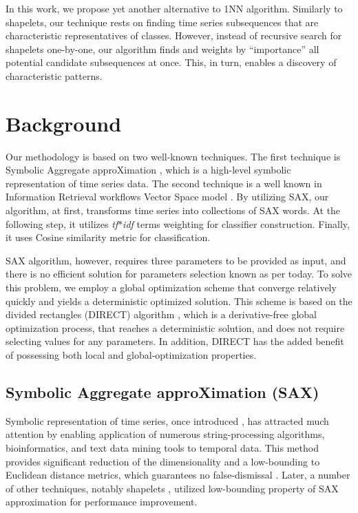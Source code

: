 \documentclass{llncs}
\begin{document}
In this work, we propose yet another alternative to 1NN algorithm. Similarly to shapelets, our
technique rests on finding time series subsequences that are characteristic representatives of
classes. However, instead of recursive search for shapelets one-by-one, our algorithm finds and
weights by ``importance'' all potential candidate subsequences at once. This, in turn, enables a
discovery of characteristic patterns.

\section{Background}
Our methodology is based on two well-known techniques. The first technique is Symbolic Aggregate
approXimation \cite{sax}, which is a high-level symbolic representation of time series
data. The second technique is a well known in Information Retrieval workflows Vector Space 
model \cite{salton}. By utilizing SAX, our algorithm, at first, transforms time series into collections of 
SAX words. At the following step, it utilizes \textit{tf$\ast$idf} terms weighting for classifier 
construction. Finally, it uses Cosine similarity metric for classification.

SAX algorithm, however, requires three parameters to be provided as input, and there is no efficient 
solution for parameters selection known as per today. To solve this problem, we employ a global 
optimization scheme that converge relatively quickly and yields a deterministic optimized solution. 
This scheme is based on the divided rectangles (DIRECT) algorithm \cite{direct}, which is
a derivative-free global optimization process, that reaches a deterministic solution, and does
not require selecting values for any parameters. In addition, DIRECT has the added benefit of
possessing both local and global-optimization properties. 

\subsection{Symbolic Aggregate approXimation (SAX)}
Symbolic representation of time series, once introduced \cite{sax}, has attracted much attention by
enabling application of numerous string-processing algorithms, bioinformatics, and text data mining 
tools to temporal data. This method provides significant reduction of the dimensionality and
a low-bounding to Euclidean distance metrics, which guarantees no false-dismissal \cite{hot_sax}.
Later, a number of other techniques, notably shapelets \cite{fast-shapelets}, utilized low-bounding
property of SAX approximation for performance improvement.
\end{document}
